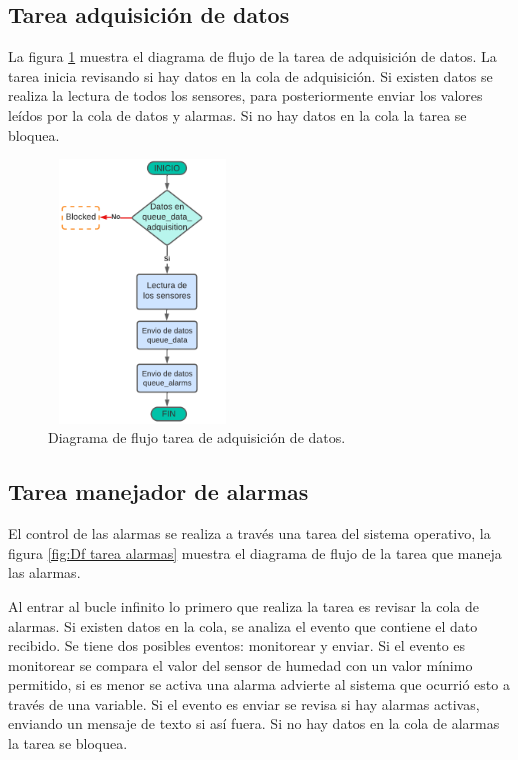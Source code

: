 \subsection{Tarea adquisición de datos} 
La figura \ref{fig:Df tarea adquisicion} muestra el diagrama de flujo de la tarea de adquisición de datos. La tarea inicia revisando si hay datos en la cola de adquisición. Si existen datos se realiza la lectura de todos los sensores, para posteriormente enviar los  valores leídos por la cola de datos y alarmas. Si no hay datos en la cola la tarea se bloquea. 

\begin{figure}[h]
  \centering
	\includegraphics[width=5cm, height=7cm]{./Figures/DF task adquisicion.png}
	\caption{Diagrama de flujo tarea de adquisición de datos.}
	\label{fig:Df tarea adquisicion}
\end{figure}

\subsection{Tarea manejador de alarmas} 
El control de las alarmas se realiza a través una tarea del sistema operativo, la figura \ref{fig:Df tarea alarmas} muestra el diagrama de flujo de la tarea que maneja las alarmas.

Al entrar al bucle infinito lo primero que realiza la tarea es revisar la cola de alarmas. Si existen datos en la cola, se analiza el evento que contiene el dato recibido. Se tiene dos posibles eventos: monitorear y enviar. Si el evento es monitorear se compara el valor del sensor de humedad con un valor mínimo permitido, si es menor se activa una alarma advierte al sistema que ocurrió esto a través de una variable. Si el evento es enviar se revisa si hay alarmas activas, enviando un mensaje de texto si así fuera. Si no hay datos en la cola de alarmas la tarea se bloquea. 

